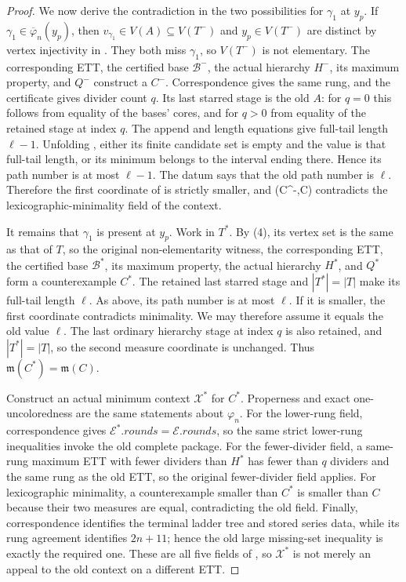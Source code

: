 \begin{proof}
We now derive the contradiction in the two possibilities for
\(\gamma_1\) at \(y_p\).  If
\(\gamma_1\in\overline\varphi_n(y_p)\), then
\(v_{\gamma_1}\in V(A)\subseteq V(T^-)\) and \(y_p\in V(T^-)\) are
distinct by vertex injectivity in .  They both
miss \(\gamma_1\), so \(V(T^-)\) is not elementary.  The corresponding
ETT, the certified base \(\mathcal B^-\), the actual hierarchy \(H^-\),
its maximum property, and \(Q^-\) construct a
 \(C^-\).  Correspondence gives the
same rung, and the certificate gives divider count \(q\).  Its last
starred stage is the old \(A\): for \(q=0\) this follows from equality of
the bases' cores, and for \(q>0\) from equality of the retained stage at
index \(q\).  The append and length equations give full-tail length
\(\ell-1\).  Unfolding , either its finite
candidate set is empty and the value is that full-tail length, or its
minimum belongs to the interval ending there.  Hence its path number is
at most \(\ell-1\).  The datum says that the old path number is
\(\ell\).  Therefore the first coordinate of
 is strictly smaller, and
(C^-,C)\) contradicts the
lexicographic-minimality field of the context.

It remains that \(\gamma_1\) is present at \(y_p\).  Work in \(T^*\).
By (4), its vertex set is the same as that of \(T\), so the original
non-elementarity witness, the corresponding ETT, the certified base
\(\mathcal B^*\), its maximum property, the actual hierarchy \(H^*\),
and \(Q^*\) form a counterexample \(C^*\).  The retained last starred
stage and \(|T^*|=|T|\) make its full-tail length \(\ell\).  As above,
its path number is at most \(\ell\).  If it is smaller, the first
coordinate contradicts minimality.  We may therefore assume it equals
the old value \(\ell\).  The last ordinary hierarchy stage at index
\(q\) is also retained, and \(|T^*|=|T|\), so the second measure
coordinate is unchanged.  Thus
\(\mathfrak m(C^*)=\mathfrak m(C)\).

Construct an actual minimum context \(\mathcal X^*\) for \(C^*\).
Properness and exact one-uncoloredness are the same statements about
\(\varphi_n\).  For the lower-rung field, correspondence gives
\(\mathcal E^*.\mathit{rounds}=\mathcal E.\mathit{rounds}\), so the
same strict lower-rung inequalities invoke the old complete package.
For the fewer-divider field, a same-rung maximum ETT with fewer dividers
than \(H^*\) has fewer than \(q\) dividers and the same rung as the old
ETT, so the original fewer-divider field applies.  For lexicographic
minimality, a counterexample smaller than \(C^*\) is smaller than \(C\)
because their two measures are equal, contradicting the old field.
Finally, correspondence identifies the terminal ladder tree and stored
series data, while its rung agreement identifies \(2n+11\); hence the
old large missing-set inequality is exactly the required one.  These
are all five fields of
, so \(\mathcal X^*\)
is not merely an appeal to the old context on a different ETT.


\end{proof}

